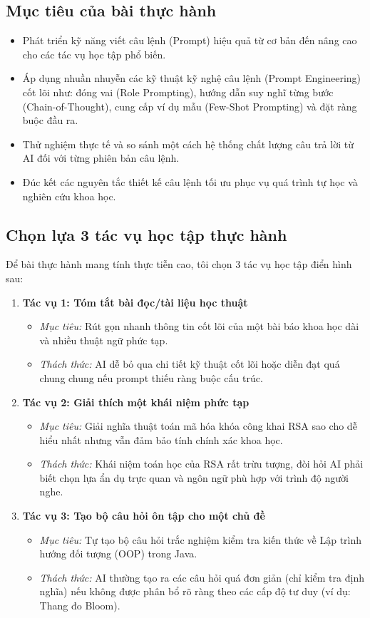 \documentclass[12pt,a4paper]{article}
\begin{document}
\subsection{Mục tiêu của bài thực hành}
\begin{itemize}
    \item Phát triển kỹ năng viết câu lệnh (Prompt) hiệu quả từ cơ bản đến nâng cao cho các tác vụ học tập phổ biến.
    \item Áp dụng nhuần nhuyễn các kỹ thuật kỹ nghệ câu lệnh (Prompt Engineering) cốt lõi như: đóng vai (Role Prompting), hướng dẫn suy nghĩ từng bước (Chain-of-Thought), cung cấp ví dụ mẫu (Few-Shot Prompting) và đặt ràng buộc đầu ra.
    \item Thử nghiệm thực tế và so sánh một cách hệ thống chất lượng câu trả lời từ AI đối với từng phiên bản câu lệnh.
    \item Đúc kết các nguyên tắc thiết kế câu lệnh tối ưu phục vụ quá trình tự học và nghiên cứu khoa học.
\end{itemize}

\subsection{Chọn lựa 3 tác vụ học tập thực hành}
Để bài thực hành mang tính thực tiễn cao, tôi chọn 3 tác vụ học tập điển hình sau:
\begin{enumerate}
    \item \textbf{Tác vụ 1: Tóm tắt bài đọc/tài liệu học thuật}
        \begin{itemize}
            \item \textit{Mục tiêu:} Rút gọn nhanh thông tin cốt lõi của một bài báo khoa học dài và nhiều thuật ngữ phức tạp.
            \item \textit{Thách thức:} AI dễ bỏ qua chi tiết kỹ thuật cốt lõi hoặc diễn đạt quá chung chung nếu prompt thiếu ràng buộc cấu trúc.
        \end{itemize}
    \item \textbf{Tác vụ 2: Giải thích một khái niệm phức tạp}
        \begin{itemize}
            \item \textit{Mục tiêu:} Giải nghĩa thuật toán mã hóa khóa công khai RSA sao cho dễ hiểu nhất nhưng vẫn đảm bảo tính chính xác khoa học.
            \item \textit{Thách thức:} Khái niệm toán học của RSA rất trừu tượng, đòi hỏi AI phải biết chọn lựa ẩn dụ trực quan và ngôn ngữ phù hợp với trình độ người nghe.
        \end{itemize}
    \item \textbf{Tác vụ 3: Tạo bộ câu hỏi ôn tập cho một chủ đề}
        \begin{itemize}
            \item \textit{Mục tiêu:} Tự tạo bộ câu hỏi trắc nghiệm kiểm tra kiến thức về Lập trình hướng đối tượng (OOP) trong Java.
            \item \textit{Thách thức:} AI thường tạo ra các câu hỏi quá đơn giản (chỉ kiểm tra định nghĩa) nếu không được phân bổ rõ ràng theo các cấp độ tư duy (ví dụ: Thang đo Bloom).
        \end{itemize}
\end{enumerate}
\end{document}
